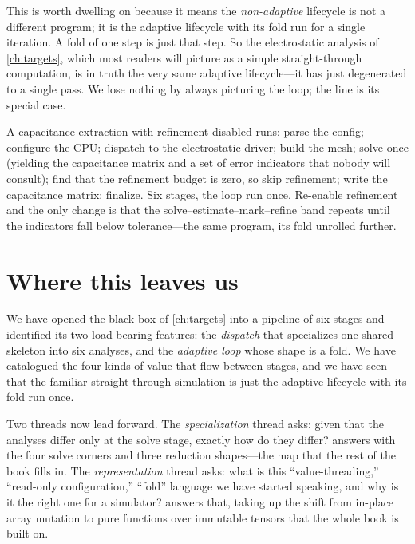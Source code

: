 This is worth dwelling on because it means the \emph{non-adaptive} lifecycle is
not a different program; it is the adaptive lifecycle with its fold run for a
single iteration. A fold of one step is just that step. So the electrostatic
analysis of \cref{ch:targets}, which most readers will picture as a simple
straight-through computation, is in truth the very same adaptive lifecycle---it
has just degenerated to a single pass. We lose nothing by always picturing the
loop; the line is its special case.

\begin{example}
A capacitance extraction with refinement disabled runs: parse the config;
configure the CPU; dispatch to the electrostatic driver; build the mesh; solve
once (yielding the capacitance matrix and a set of error indicators that nobody
will consult); find that the refinement budget is zero, so skip refinement; write
the capacitance matrix; finalize. Six stages, the loop run once. Re-enable
refinement and the only change is that the solve--estimate--mark--refine band
repeats until the indicators fall below tolerance---the same program, its fold
unrolled further.
\end{example}

\section{Where this leaves us}

We have opened the black box of \cref{ch:targets} into a pipeline of six stages
and identified its two load-bearing features: the \emph{dispatch} that
specializes one shared skeleton into six analyses, and the \emph{adaptive loop}
whose shape is a fold. We have catalogued the four kinds of value that flow
between stages, and we have seen that the familiar straight-through simulation is
just the adaptive lifecycle with its fold run once.

Two threads now lead forward. The \emph{specialization} thread asks: given that
the analyses differ only at the solve stage, exactly how do they differ?
 answers with the four solve corners and three reduction
shapes---the map that the rest of the book fills in. The \emph{representation}
thread asks: what is this ``value-threading,'' ``read-only configuration,''
``fold'' language we have started speaking, and why is it the right one for a
simulator?  answers that, taking up the shift from in-place
array mutation to pure functions over immutable tensors that the whole book is
built on.

